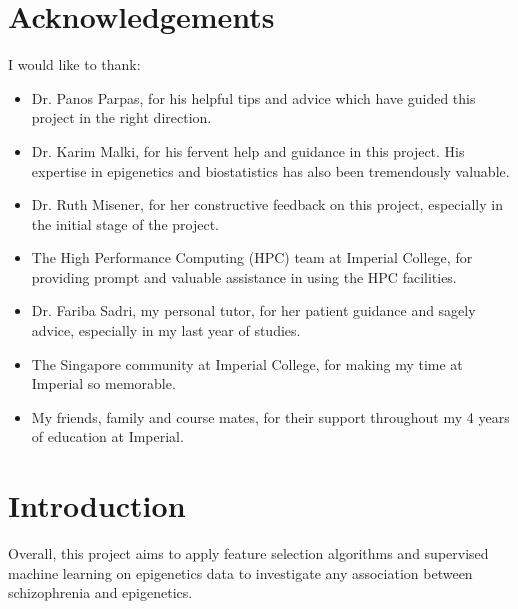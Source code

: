 \documentclass[12pt, twoside, a4paper]{report}
\newcommand\blankpage{%
    \null
    \thispagestyle{empty}%
    \addtocounter{page}{-1}%
    \newpage}
\begin{document}
\afterpage{\blankpage}

\chapter*{Acknowledgements}


I would like to thank:
\begin{itemize}
  \item Dr. Panos Parpas, for his helpful tips and advice which have guided this project in the right direction.
  \item Dr. Karim Malki, for his fervent help and guidance in this project. His expertise in epigenetics and biostatistics has also been tremendously valuable.
  \item Dr. Ruth Misener, for her constructive feedback on this project, especially in the initial stage of the project.
  \item The High Performance Computing (HPC) team at Imperial College, for providing prompt and valuable assistance in using the HPC facilities.
  \item Dr. Fariba Sadri, my personal tutor, for her patient guidance and sagely advice, especially in my last year of studies.
  \item The Singapore community at Imperial College, for making my time at Imperial so memorable.
  \item My friends, family and course mates, for their support throughout my 4 years of education at Imperial.
\end{itemize}



\afterpage{\blankpage}

\onehalfspacing
\tableofcontents
\singlespacing

\newpage


\chapter{Introduction}


Overall, this project aims to apply feature selection algorithms and supervised machine learning on epigenetics data to investigate any association between schizophrenia and epigenetics.
\end{document}
